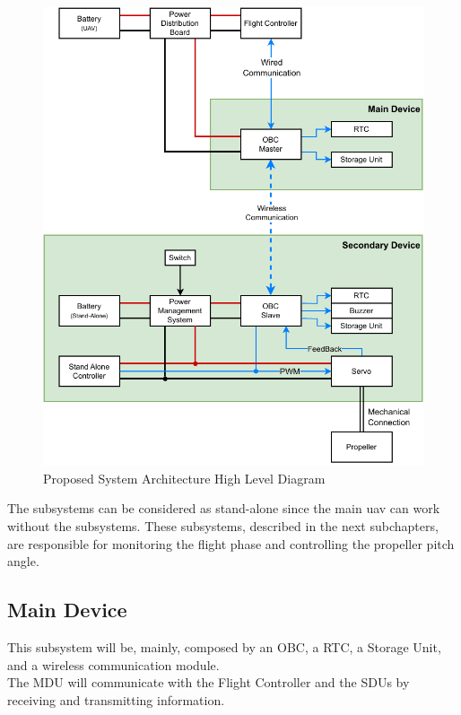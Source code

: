 \begin{figure}[H]
    \centering
    \includegraphics[scale=1]{ch4/assets/system_diagram.pdf}
    \caption{Proposed System Architecture High Level Diagram}
    \label{fig:system_diagram}
\end{figure}

The subsystems can be considered as stand-alone since the main \gls{uav} can work without the subsystems.
These subsystems, described in the next subchapters, are responsible for monitoring the flight phase and controlling the propeller pitch angle.

\subsection{Main Device}
This subsystem will be, mainly, composed by an \gls{OBC}, a \gls{RTC}, a Storage Unit, and a wireless communication module.\\
The MDU will communicate with the Flight Controller and the SDUs by receiving and transmitting information.

